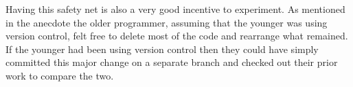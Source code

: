   Having this safety net is also a very good incentive to experiment.  As
  mentioned in the anecdote the older programmer, assuming that the younger
  was using version control, felt free to delete most of the code and
  rearrange what remained.  If the younger had been using version control then
  they could have simply committed this major change on a separate branch and
  checked out their prior work to compare the two.
